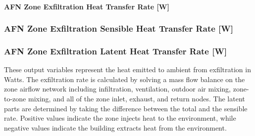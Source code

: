 \paragraph{AFN Zone Exfiltration Heat Transfer Rate {[}W{]}}\label{afn-zone-exfiltration-heat-transfer-rate-w}

\subsubsection{AFN Zone Exfiltration Sensible Heat Transfer Rate {[}W{]}}\label{afn-zone-exfiltration-sensible-heat-transfer-rate-w}

\subsubsection{AFN Zone Exfiltration Latent Heat Transfer Rate {[}W{]}}\label{afn-zone-exfiltration-latent-heat-transfer-rate-w}

These output variables represent the heat emitted to ambient from exfiltration in Watts. The exfiltration rate is calculated by solving a mass flow balance on the zone airflow network including infiltration, ventilation, outdoor air mixing, zone-to-zone mixing, and all of the zone inlet, exhaust, and return nodes. The latent parts are determined by taking the difference between the total and the sensible rate. Positive values indicate the zone injects heat to the environment, while negative values indicate the building extracts heat from the environment. 

